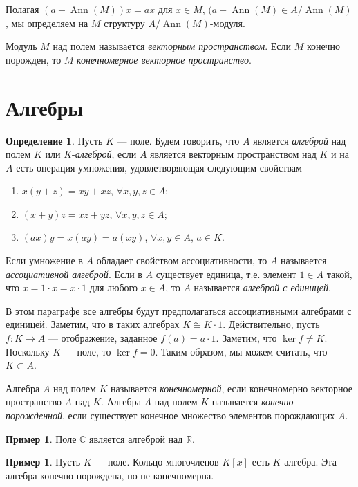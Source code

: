 \documentclass[12pt, titlepage, oneside]{amsbook}
\newcommand{\Ann}{\operatorname{Ann}}
\newcommand{\RR}{\mathbb{R}}
\newcommand{\CC}{\mathbb{C}}
\theoremstyle{definition}
\newtheorem{example}[theorem]{Пример}
\newtheorem{definition}[theorem]{Определение}
\theoremstyle{remark}
\begin{document}
Полагая $(a+\Ann(M))x=ax$ для $x\in M$, $(a+\Ann(M)\in A/\Ann(M)$, мы определяем на $M$ структуру $A/\Ann(M)$-модуля.

Модуль $M$ над полем называется \emph{векторным пространством}. Если $M$ конечно порожден, то $M$ \emph{конечномерное векторное пространство}.


\section{Алгебры}

\begin{definition}
	Пусть $K$ --- поле. Будем говорить, что $A$ является \emph{алгеброй} над полем $K$ или $K$-\emph{алгеброй}, если $A$ является векторным пространством над $K$ и на $A$ есть операция умножения, удовлетворяющая следующим свойствам
	\begin{enumerate}
		\item $x(y+z)=xy+xz$, $\forall x,y,z\in A$;
		\item $(x+y)z=xz+yz$, $\forall x,y,z\in A$;
		\item $(ax)y=x(ay)=a(xy)$, $\forall x,y\in A$, $a\in K$.
	\end{enumerate}
	Если умножение в $A$ обладает свойством ассоциативности, то $A$ называется \emph{ассоциативной алгеброй}. Если в $A$ существует единица, т.е. элемент $1\in A$ такой, что $x=1\cdot x=x\cdot1$ для любого $x\in A$, то $A$ называется \emph{алгеброй с единицей}.
\end{definition}

В этом параграфе все алгебры будут предполагаться ассоциативными алгебрами с единицей. Заметим, что в таких алгебрах $K\cong K\cdot 1$. Действительно, пусть $f\colon K\rightarrow A$ --- отображение, заданное $f(a)=a\cdot 1$. Заметим, что $\ker f\neq K$. Поскольку $K$ --- поле, то $\ker f=0$. Таким образом, мы можем считать, что $K\subset A$.

Алгебра $A$ над полем $K$ называется \emph{конечномерной}, если конечномерно векторное пространство $A$ над $K$. Алгебра $A$ над полем $K$ называется \emph{конечно порожденной}, если существует конечное множество элементов порождающих $A$.

\begin{example}
	Поле $\CC$ является алгеброй над $\RR$.
\end{example}

\begin{example}
	Пусть $K$ --- поле. Кольцо многочленов $K[x]$ есть $K$-алгебра. Эта алгебра конечно порождена, но не конечномерна.
\end{example}
\end{document}

